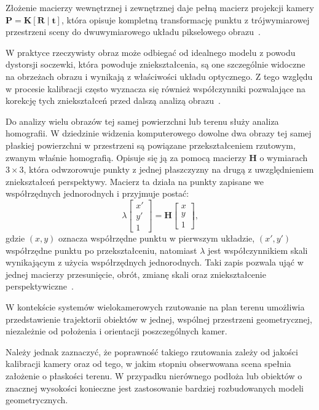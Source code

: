 Złożenie macierzy wewnętrznej i zewnętrznej daje pełną macierz projekcji kamery \(\mathbf{P} =
\mathbf{K}[\mathbf{R} \mid \mathbf{t}]\), która opisuje kompletną transformację punktu z
trójwymiarowej przestrzeni sceny do dwuwymiarowego układu pikselowego
obrazu~\cite{hartleyzisserman}.

W praktyce rzeczywisty obraz może odbiegać od idealnego modelu z powodu dystorsji soczewki, która
powoduje zniekształcenia, są one szczególnie widoczne na obrzeżach obrazu i wynikają z właściwości
układu optycznego. Z tego względu w procesie kalibracji często wyznacza się również współczynniki
pozwalające na korekcję tych zniekształceń przed dalszą analizą obrazu~\cite{szeliski2022}.

Do analizy wielu obrazów tej samej powierzchni lub terenu służy analiza homografii. W dziedzinie
widzenia komputerowego dowolne dwa obrazy tej samej płaskiej powierzchni w przestrzeni są powiązane
przekształceniem rzutowym, zwanym właśnie homografią. Opisuje się ją za pomocą macierzy
\(\mathbf{H}\) o wymiarach \(3 \times 3\), która odwzorowuje punkty z jednej płaszczyzny na drugą z
uwzględnieniem zniekształceń perspektywy. Macierz ta działa na punkty zapisane we współrzędnych
jednorodnych i przyjmuje postać:
\[
  \lambda
  \begin{bmatrix}
    x' \\
    y' \\
    1
  \end{bmatrix}
  =
  \mathbf{H}
  \begin{bmatrix}
    x \\
    y \\
    1
  \end{bmatrix},
\]
gdzie \((x, y)\) oznacza współrzędne punktu w pierwszym układzie, \((x', y')\) współrzędne punktu
po przekształceniu, natomiast \(\lambda\) jest współczynnikiem skali wynikającym z użycia
współrzędnych jednorodnych. Taki zapis pozwala ująć w jednej macierzy przesunięcie, obrót, zmianę
skali oraz zniekształcenie perspektywiczne~\cite{zhang2000, szeliski2022}.

W kontekście systemów wielokamerowych rzutowanie na plan terenu umożliwia przedstawienie
trajektorii obiektów w jednej, wspólnej przestrzeni geometrycznej, niezależnie od położenia i
orientacji poszczególnych kamer.

Należy jednak zaznaczyć, że poprawność takiego rzutowania zależy od jakości kalibracji kamery oraz
od tego, w jakim stopniu obserwowana scena spełnia założenie o płaskości terenu. W przypadku
nierównego podłoża lub obiektów o znacznej wysokości konieczne jest zastosowanie bardziej
rozbudowanych modeli geometrycznych.

